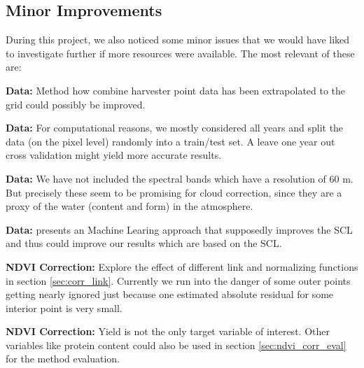 {    \subsection{Minor Improvements}
        During this project, we also noticed some minor issues that we would have liked to investigate further if more resources were available. The most relevant of these are:
        \begin{Nitemize}
            \item \textbf{Data:}
            Method how combine harvester point data has been extrapolated to the grid could possibly be improved.
            \item \textbf{Data:}
            For computational reasons, we mostly considered all years and split the data (on the pixel level) randomly into a train/test set. A leave one year out cross validation might yield more accurate results.
            \item \textbf{Data:}
            We have not included the spectral bands which have a resolution of 60 m. But precisely these seem to be promising for cloud correction, since they are a proxy of the water (content and form) in the atmosphere.
            \item \textbf{Data:}
            \cite{raiyaniSentinel2ImageScene2021} presents an Machine Learing approach that supposedly improves the SCL and thus could improve our results which are based on the SCL.
            \item \textbf{NDVI Correction:}
            Explore the effect of different link and normalizing functions %
            in section \ref{sec:corr_link}. Currently we run into the danger of some outer points getting nearly ignored just because one estimated absolute residual for some interior point is very small.
            \item \textbf{NDVI Correction:}
            Yield is not the only target variable of interest. Other variables like protein content could also be used in section \ref{sec:ndvi_corr_eval} for the method evaluation. 
        \end{Nitemize}
}


